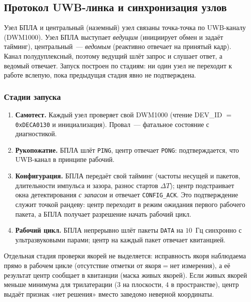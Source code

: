 \FloatBarrier

\subsection{Протокол UWB-линка и синхронизация узлов}
\label{sec:protocol}

Узел БПЛА и центральный (наземный) узел связаны точка-точка по UWB-каналу
(DWM1000). Узел БПЛА выступает \emph{ведущим} (инициирует обмен и задаёт тайминг),
центральный~--- \emph{ведомым} (реактивно отвечает на принятый кадр). Канал
полудуплексный, поэтому ведущий шлёт запрос и слушает ответ, а ведомый отвечает.
Запуск построен по стадиям: ни один узел не переходит к работе вслепую, пока
предыдущая стадия явно не подтверждена.

\subsubsection{Стадии запуска}

\begin{enumerate}
\item \textbf{Самотест.} Каждый узел проверяет свой DWM1000 (чтение
  DEV\_ID $=$ \texttt{0xDECA0130} и инициализация). Провал~--- фатальное состояние
  с диагностикой.
\item \textbf{Рукопожатие.} БПЛА шлёт \texttt{PING}, центр отвечает \texttt{PONG}:
  подтверждается, что UWB-канал в принципе рабочий.
\item \textbf{Конфигурация.} БПЛА передаёт свой тайминг (частоты несущей и пакетов,
  длительности импульса и зазора, разнос стартов $\Delta T$); центр подстраивает
  окна детектирования \emph{с запасом} и отвечает \texttt{CONFIG\_ACK}. Это
  подтверждение служит точкой рандеву: центр переходит в режим ожидания первого
  рабочего пакета, а БПЛА получает разрешение начать рабочий цикл.
\item \textbf{Рабочий цикл.} БПЛА непрерывно шлёт пакеты \texttt{DATA} на $10$~Гц
  синхронно с ультразвуковыми парами; центр на каждый пакет отвечает квитанцией.
\end{enumerate}

Отдельная стадия проверки якорей не выделяется: исправность якоря наблюдаема прямо
в рабочем цикле (отсутствие отметки от якоря${=}$нет измерения), а её результат
центр сообщает в квитанции (маска живых якорей). Если живых якорей меньше минимума
для трилатерации ($3$ на плоскости, $4$ в пространстве), центр выдаёт признак
«нет решения» вместо заведомо неверной координаты.

